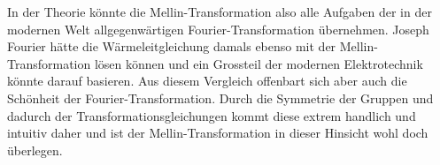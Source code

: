In der Theorie könnte die Mellin-Transformation also alle Aufgaben der 
in der modernen Welt allgegenwärtigen Fourier-Transformation übernehmen. 
Joseph Fourier hätte die Wärmeleitgleichung damals ebenso mit der 
Mellin-Transformation lösen können und ein Grossteil der modernen 
Elektrotechnik könnte darauf basieren. 
Aus diesem Vergleich offenbart sich aber auch die Schönheit der 
Fourier-Transformation. 
Durch die Symmetrie der Gruppen und dadurch der Transformationsgleichungen 
kommt diese extrem handlich und intuitiv daher und ist der 
Mellin-Transformation in dieser Hinsicht wohl doch überlegen.



